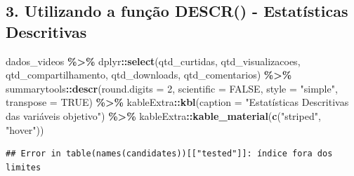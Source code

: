 \documentclass[
]{article}
\newenvironment{Shaded}{\begin{snugshade}}{\end{snugshade}}
\newcommand{\AttributeTok}[1]{\textcolor[rgb]{0.13,0.29,0.53}{#1}}
\newcommand{\ConstantTok}[1]{\textcolor[rgb]{0.56,0.35,0.01}{#1}}
\newcommand{\DecValTok}[1]{\textcolor[rgb]{0.00,0.00,0.81}{#1}}
\newcommand{\FunctionTok}[1]{\textcolor[rgb]{0.13,0.29,0.53}{\textbf{#1}}}
\newcommand{\NormalTok}[1]{#1}
\newcommand{\SpecialCharTok}[1]{\textcolor[rgb]{0.81,0.36,0.00}{\textbf{#1}}}
\newcommand{\StringTok}[1]{\textcolor[rgb]{0.31,0.60,0.02}{#1}}
\begin{document}
\subsection{3. Utilizando a função DESCR() - Estatísticas
Descritivas}\label{utilizando-a-funuxe7uxe3o-descr---estatuxedsticas-descritivas}

\begin{Shaded}
\begin{Highlighting}[]
\NormalTok{dados\_videos }\SpecialCharTok{\%\textgreater{}\%}
\NormalTok{  dplyr}\SpecialCharTok{::}\FunctionTok{select}\NormalTok{(qtd\_curtidas, qtd\_visualizacoes, qtd\_compartilhamento, qtd\_downloads, qtd\_comentarios) }\SpecialCharTok{\%\textgreater{}\%}
\NormalTok{  summarytools}\SpecialCharTok{::}\FunctionTok{descr}\NormalTok{(}\AttributeTok{round.digits =} \DecValTok{2}\NormalTok{, }\AttributeTok{scientific =} \ConstantTok{FALSE}\NormalTok{, }\AttributeTok{style =} \StringTok{"simple"}\NormalTok{, }\AttributeTok{transpose =} \ConstantTok{TRUE}\NormalTok{) }\SpecialCharTok{\%\textgreater{}\%}
\NormalTok{  kableExtra}\SpecialCharTok{::}\FunctionTok{kbl}\NormalTok{(}\AttributeTok{caption =} \StringTok{"Estatísticas Descritivas das variáveis objetivo"}\NormalTok{) }\SpecialCharTok{\%\textgreater{}\%}
\NormalTok{  kableExtra}\SpecialCharTok{::}\FunctionTok{kable\_material}\NormalTok{(}\FunctionTok{c}\NormalTok{(}\StringTok{"striped"}\NormalTok{, }\StringTok{"hover"}\NormalTok{))}
\end{Highlighting}
\end{Shaded}

\begin{verbatim}
## Error in table(names(candidates))[["tested"]]: índice fora dos limites
\end{verbatim}
\end{document}
